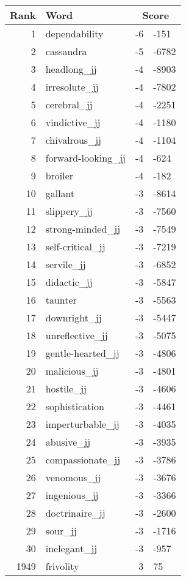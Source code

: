 \begin{longtable}[!htbp]{| rlr@{.}l |}
    \hline
    \textbf{Rank} & \textbf{Word} & \multicolumn{2}{c|}{\textbf{Score}} \\
    \hline
    \endhead
    1 & dependability & -6 & -151 \\
    2 & cassandra & -5 & -6782 \\
    3 & headlong\_jj & -4 & -8903 \\
    4 & irresolute\_jj & -4 & -7802 \\
    5 & cerebral\_jj & -4 & -2251 \\
    6 & vindictive\_jj & -4 & -1180 \\
    7 & chivalrous\_jj & -4 & -1104 \\
    8 & forward-looking\_jj & -4 & -624 \\
    9 & broiler & -4 & -182 \\
    10 & gallant & -3 & -8614 \\
    11 & slippery\_jj & -3 & -7560 \\
    12 & strong-minded\_jj & -3 & -7549 \\
    13 & self-critical\_jj & -3 & -7219 \\
    14 & servile\_jj & -3 & -6852 \\
    15 & didactic\_jj & -3 & -5847 \\
    16 & taunter & -3 & -5563 \\
    17 & downright\_jj & -3 & -5447 \\
    18 & unreflective\_jj & -3 & -5075 \\
    19 & gentle-hearted\_jj & -3 & -4806 \\
    20 & malicious\_jj & -3 & -4801 \\
    21 & hostile\_jj & -3 & -4606 \\
    22 & sophistication & -3 & -4461 \\
    23 & imperturbable\_jj & -3 & -4035 \\
    24 & abusive\_jj & -3 & -3935 \\
    25 & compassionate\_jj & -3 & -3786 \\
    26 & venomous\_jj & -3 & -3676 \\
    27 & ingenious\_jj & -3 & -3366 \\
    28 & doctrinaire\_jj & -3 & -2600 \\
    29 & sour\_jj & -3 & -1716 \\
    30 & inelegant\_jj & -3 & -957 \\
    1949 & frivolity & 3 & 75 \\

\end{longtable}
